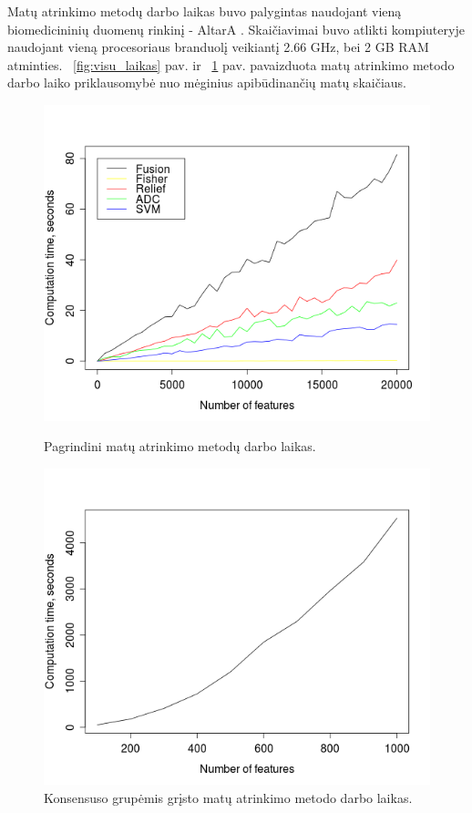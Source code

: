 Matų atrinkimo metodų darbo laikas buvo palygintas naudojant vieną biomedicininių duomenų rinkinį - AltarA \cite{altara}. Skaičiavimai buvo atlikti kompiuteryje naudojant vieną procesoriaus branduolį veikiantį 2.66 GHz, bei 2 GB RAM atminties. ~\ref{fig:visu_laikas} pav. ir ~\ref{fig:cgs_laikas} pav. pavaizduota matų atrinkimo metodo darbo laiko priklausomybė nuo mėginius apibūdinančių matų skaičiaus. 
\begin{figure}[hq]
\begin{minipage}[b]{0.45\linewidth}
\centering
\includegraphics[width=1\textwidth]{images/all_performance.png}
 \caption{Pagrindini matų atrinkimo metodų darbo laikas.}
 \label{fig:visu_laikas}
\end{minipage}
\hspace{0.2cm}
\begin{minipage}[b]{0.45\linewidth}
\centering
\includegraphics[width=1\textwidth]{images/cgs_performance.png}
 \caption{Konsensuso grupėmis grįsto matų atrinkimo metodo darbo laikas.}
 \label{fig:cgs_laikas}
\end{minipage}
\end{figure}

